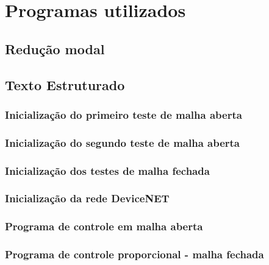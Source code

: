 


\chapter{Programas utilizados}

\section{Redução modal}
\label {reducaoModalPrograma}


\section{Texto Estruturado}
\label {stsection}

\subsection{Inicialização do primeiro teste de malha aberta}
\label {stMAinit1}


\subsection{Inicialização do segundo teste de malha aberta}
\label {stMAinit2}


\subsection{Inicialização dos testes de malha fechada}
\label {stMFinit}


\subsection{Inicialização da rede DeviceNET}
\label{dninitST}


\subsection{Programa de controle em malha aberta}
\label{maprogST}


\subsection{Programa de controle proporcional - malha fechada}
\label{mfprogST}


